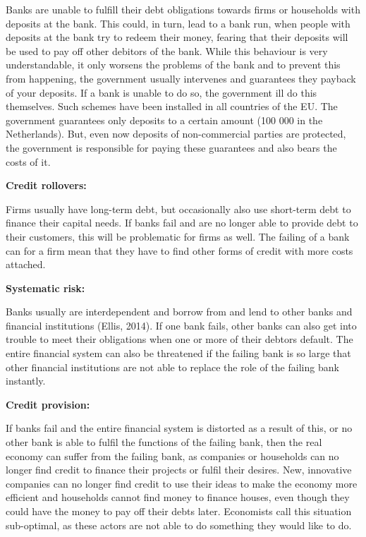 \documentclass[DIV=calc, paper=a4, fontsize=11pt, twocolumn]{scrartcl}	 %
\begin{document}
Banks are unable to fulfill their debt obligations towards firms or households with deposits at the bank. This could, in turn, lead to a bank run, when people with deposits at the bank try to redeem their money, fearing that their deposits will be used to pay off other debitors of the bank. While this behaviour is very understandable, it only worsens the problems of the bank and to prevent this from happening, the government usually intervenes and guarantees they payback of your deposits. If a bank is unable to do so, the government ill do this themselves. Such schemes have been installed in all countries of the EU. The government guarantees only deposits to a certain amount (100 000 in the Netherlands). But, even now deposits of non-commercial parties are protected, the government is responsible for paying these guarantees and also bears the costs of it. 

\textbf{Credit rollovers:}

Firms usually have long-term debt, but occasionally also use short-term debt to finance their capital needs. If banks fail and are no longer able to provide debt to their customers, this will be problematic for firms as well. The failing of a bank can for a firm mean that they have to find other forms of credit with more costs attached. 

\textbf{Systematic risk:}

Banks usually are interdependent and borrow from and lend to other banks and financial institutions (Ellis, 2014). If one bank fails, other banks can also get into trouble to meet their obligations when one or more of their debtors default. The entire financial system can also be threatened if the failing bank is so large that other financial institutions are not able to replace the role of the failing bank instantly. 

\textbf{Credit provision:}

If banks fail and the entire financial system is distorted as a result of this, or no other bank is able to fulfil the functions of the failing bank, then the real economy can suffer from the failing bank, as companies or households can no longer find credit to finance their projects or fulfil their desires. New, innovative companies can no longer find credit to use their ideas to make the economy more efficient and households cannot find money to finance houses, even though they could have the money to pay off their debts later. Economists call this situation sub-optimal, as these actors are not able to do something they would like to do. 
\end{document}
